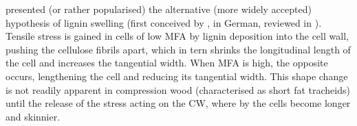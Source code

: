 \cite{Boyd_1972} presented (or rather popularised) the alternative (more widely
accepted) hypothesis of lignin swelling (first conceived by \cite{munch1938}, in German, reviewed in \cite{Boyd_1972}). Tensile
stress is gained in cells of low MFA by lignin deposition into the cell wall,
pushing the cellulose fibrils apart, which in tern shrinks the longitudinal
length of the cell and increases the tangential width. When MFA is high, the
opposite occurs, lengthening the cell and reducing its tangential width. This
shape change is not readily apparent in compression wood (characterised as short fat
tracheids) until the release of the stress acting on the CW, where by the cells
become longer and skinnier.
